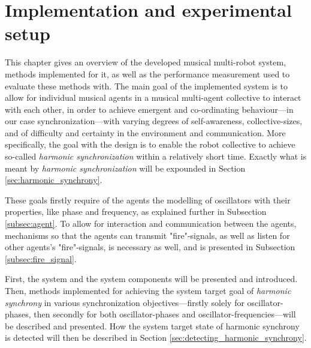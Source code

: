 \chapter{Implementation and experimental setup} %
\label{chap:implementation}




	


This chapter gives an overview of the developed musical multi-robot system, methods implemented for it, as well as the performance measurement used to evaluate these methods with. The main goal of the implemented system is to allow for individual musical agents in a musical multi-agent collective to interact with each other, in order to achieve emergent and co-ordinating behaviour—in our case synchronization—with varying degrees of self-awareness, collective-sizes, and of difficulty and certainty in the environment and communication. More specifically, the goal with the design is to enable the robot collective to achieve so-called \textit{harmonic synchronization} within a relatively short time. Exactly what is meant by \textit{harmonic synchronization} will be expounded in Section \ref{sec:harmonic_synchrony}.

These goals firstly require of the agents the modelling of oscillators with their properties, like phase and frequency, as explained further in Subsection \ref{subsec:agent}. To allow for interaction and communication between the agents, mechanisms so that the agents can transmit "fire"-signals, as well as listen for other agents's "fire"-signals, is necessary as well, and is presented in Subsection \ref{subsec:fire_signal}.

First, the system and the system components will be presented and introduced. Then, methods implemented for achieving the system target goal of \textit{harmonic synchrony} in various synchronization objectives—firstly solely for oscillator-phases, then secondly for both oscillator-phases and oscillator-frequencies—will be described and presented. How the system target state of harmonic synchrony is detected will then be described in Section \ref{sec:detecting_harmonic_synchrony}.



